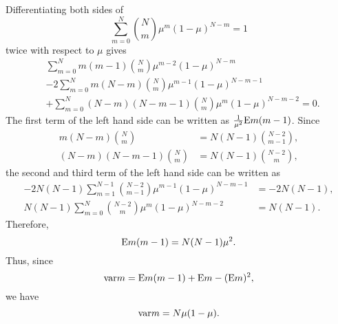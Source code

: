 Differentiating both sides of 
%
\begin{equation}
\sum_{m = 0}^{N} {N \choose m} \mu ^ m (1 - \mu) ^ {N - m}  = 1
\end{equation}
%
twice with respect to $\mu$ gives
%
\begin{equation}
\begin{aligned}
&\sum_{m = 0}^{N} m (m - 1) {N \choose m} \mu ^ {m - 2} (1 - \mu) ^ {N - m} \\
&- 2 \sum_{m = 0}^{N} m (N - m) {N \choose m} \mu ^ {m - 1} (1 - \mu) ^ {N - m - 1} \\
&+ \sum_{m = 0}^{N} (N - m) (N - m - 1) {N \choose m} \mu ^ m (1 - \mu) ^ {N - m - 2} = 0.
\end{aligned}
\end{equation}
%
The first term of the left hand side can be written as $\frac{1}{\mu ^ 2} {\rm E} m (m - 1)$.
Since
%
\begin{equation}
\begin{aligned}
m (N - m) {N \choose m} &= N (N - 1) {N - 2 \choose m - 1}, \\
(N - m) (N - m - 1) {N \choose m} &= N (N - 1) {N - 2 \choose m},
\end{aligned}
\end{equation}
%
the second and third term of the left hand side can be written as
%
\begin{equation}
\begin{aligned}
- 2 N (N - 1) \sum_{m = 1}^{N - 1} {N - 2 \choose m - 1} \mu ^ {m - 1} (1 - \mu) ^ {N - m - 1} &= - 2 N (N - 1), \\
N (N - 1) \sum_{m = 0}^{N} {N - 2 \choose m} \mu ^ m (1 - \mu) ^ {N - m - 2} &= N (N - 1).
\end{aligned}
\end{equation}
%
Therefore,
%
\begin{equation}
{\rm E} m (m - 1) = N (N - 1) \mu ^ 2.
\end{equation}
%
Thus, since 
%
\begin{equation}
{\rm var} m = {\rm E} m (m - 1) + {\rm E} m - ( {\rm E} m ) ^ 2,
\end{equation}
%
we have
%
\begin{equation}
{\rm var} m = N \mu ( 1 - \mu).
\end{equation}
%




















